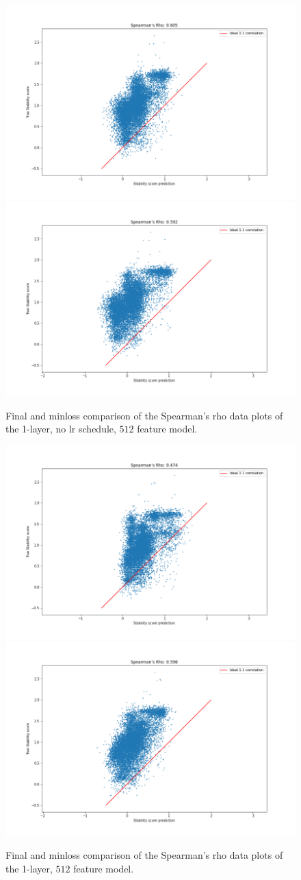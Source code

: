 \begin{figure}[!ht]
  \includegraphics[width=0.49\linewidth]{latex/imgs/spearman_1_layer_no_schedule_512_final.png}
  \includegraphics[width=0.49\linewidth]{latex/imgs/spearman_1_layer_no_schedule_512_minloss.png}
  \caption{Final and minloss comparison of the Spearman's rho data plots of the 1-layer, no lr schedule, $512$ feature model.}
\end{figure}
\begin{figure}[!ht]
  \includegraphics[width=0.49\linewidth]{latex/imgs/spearman_1_layer_with_schedule_512_final.png}
  \includegraphics[width=0.49\linewidth]{latex/imgs/spearman_1_layer_with_schedule_512_minloss.png}
  \caption{Final and minloss comparison of the Spearman's rho data plots of the 1-layer, $512$ feature model.}
\end{figure}
